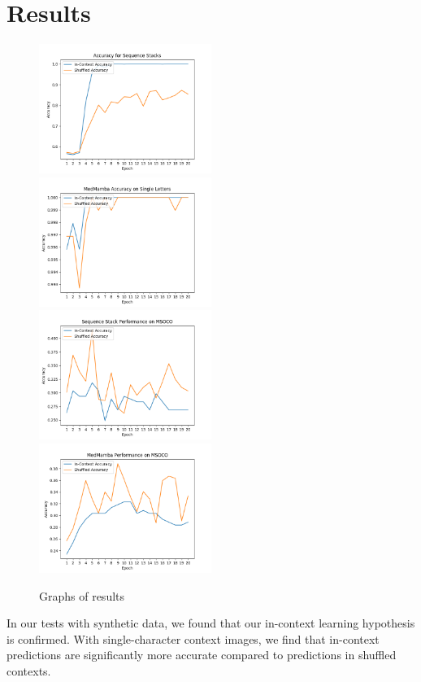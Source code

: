 \section{Results}
\begin{figure}[ht]
    \includegraphics[width=0.5\textwidth]{figures/sequence_stack_mnist_like.png}
    \includegraphics[width=0.5\textwidth]{figures/medmamba_mnist_like.png}
    \includegraphics[width=0.5\textwidth]{figures/sequence_stack_mscoco.png}
    \includegraphics[width=0.5\textwidth]{figures/medmamba_mscoco.png}
    \caption{Graphs of results}
    \label{resultslide}
\end{figure}
In our tests with synthetic data, we found that our in-context learning
hypothesis is confirmed. With single-character context images, we find that
in-context predictions are significantly more accurate compared to predictions
in shuffled contexts.

